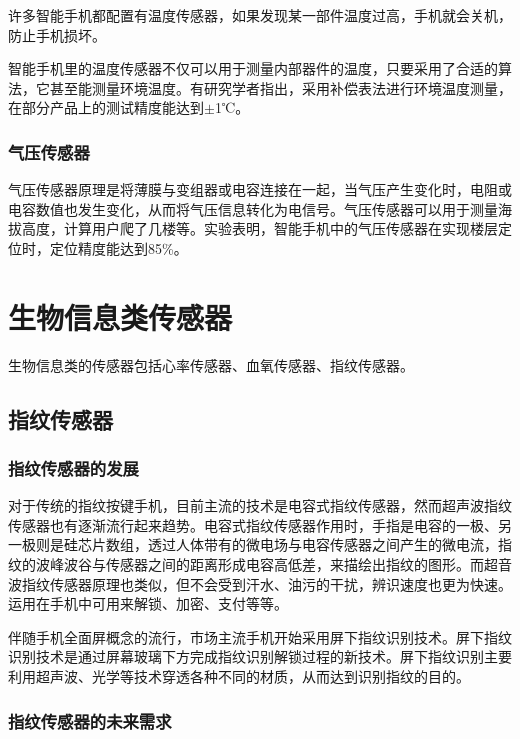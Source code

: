 \documentclass[a4paper,11pt,onecolumn,twoside]{article}
\begin{document}
\begin{multicols}{2}
许多智能手机都配置有温度传感器，如果发现某一部件温度过高，手机就会关机，防止手机损坏。

智能手机里的温度传感器不仅可以用于测量内部器件的温度，只要采用了合适的算法，它甚至能测量环境温度。有研究学者指出，采用补偿表法进行环境温度测量，在部分产品上的测试精度能达到$\pm$1℃\cite{Temperature}。

\subsubsection{气压传感器}

气压传感器原理是将薄膜与变组器或电容连接在一起，当气压产生变化时，电阻或电容数值也发生变化，从而将气压信息转化为电信号。气压传感器可以用于测量海拔高度，计算用户爬了几楼等。实验表明，智能手机中的气压传感器在实现楼层定位时，定位精度能达到85\%\cite{storeyDetect}。


\section{生物信息类传感器}

生物信息类的传感器包括心率传感器、血氧传感器、指纹传感器。

\subsection{指纹传感器}

\subsubsection{指纹传感器的发展}

对于传统的指纹按键手机，目前主流的技术是电容式指纹传感器，然而超声波指纹传感器也有逐渐流行起来趋势。电容式指纹传感器作用时，手指是电容的一极、另一极则是硅芯片数组，透过人体带有的微电场与电容传感器之间产生的微电流，指纹的波峰波谷与传感器之间的距离形成电容高低差，来描绘出指纹的图形。而超音波指纹传感器原理也类似，但不会受到汗水、油污的干扰，辨识速度也更为快速。运用在手机中可用来解锁、加密、支付等等。

伴随手机全面屏概念的流行，市场主流手机开始采用屏下指纹识别技术。屏下指纹识别技术是通过屏幕玻璃下方完成指纹识别解锁过程的新技术。屏下指纹识别主要利用超声波、光学等技术穿透各种不同的材质，从而达到识别指纹的目的。\cite{UsageWid}

\subsubsection{指纹传感器的未来需求}


\end{multicols}
\end{document}

